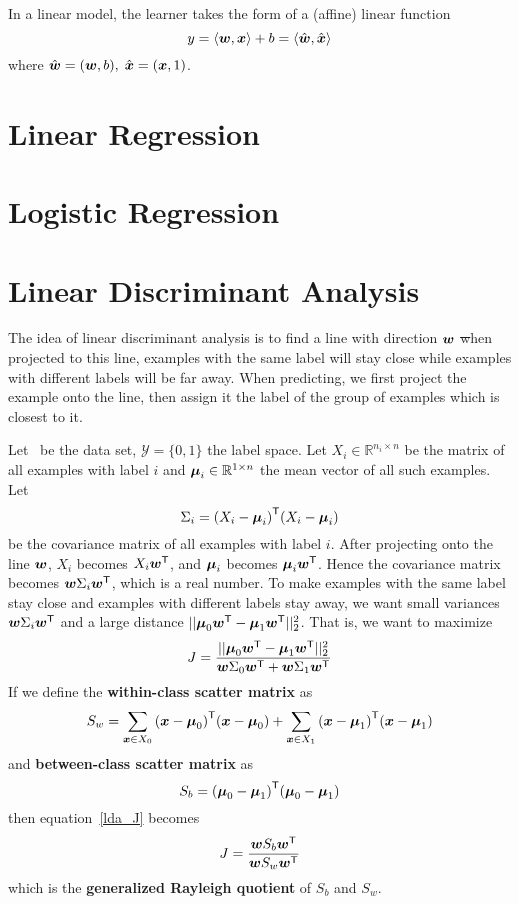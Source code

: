 In a linear model, the learner takes the form of a (affine) linear function
$$y = \langle\boldsymbol{w}, \boldsymbol{x}\rangle + b = \langle\hat{\boldsymbol{w}}, \hat{\boldsymbol{x}}\rangle$$
where $\hat{\boldsymbol{w}}=(\boldsymbol{w}, b),\;\hat{\boldsymbol{x}} = (\boldsymbol{x}, 1)$.
\section{Linear Regression}

\section{Logistic Regression}

\section{Linear Discriminant Analysis}
The idea of linear discriminant analysis is to find a line with direction $\boldsymbol{w}$ \st when
projected to this line, examples with the same label will stay close while examples with different
labels will be far away. When predicting, we first project the example onto the line, then assign it the
label of the group of examples which is closest to it.

Let \dataset\ be the data set, $\mathcal{Y} = \{0, 1\}$ the label space. Let 
$X_i \in \mathbb{R}^{n_i \times n}$ be the matrix of all examples with label $i$ and 
$\boldsymbol{\mu}_i \in \mathbb{R}^{1 \times n}$ the mean vector of all such examples. Let 
$$ \Sigma_i = {(X_i - \boldsymbol{\mu}_i)}^\mathsf{T}(X_i - \boldsymbol{\mu}_i)$$
be the covariance matrix of all examples with label $i$. After
projecting onto the line $\boldsymbol{w}$, $X_i$ becomes $X_i {\boldsymbol{w}}^\mathsf{T}$, and $\boldsymbol{\mu}_i$ becomes
$\boldsymbol{\mu}_i{\boldsymbol{w}}^\mathsf{T}$. Hence the covariance matrix becomes $\boldsymbol{w} \Sigma_i {\boldsymbol{w}}^\mathsf{T}$, which is a real number.
To make examples with the same label stay close and examples with different labels stay away, we want small 
variances $\boldsymbol{w} \Sigma_i {\boldsymbol{w}}^\mathsf{T}$ and a large distance $||{\boldsymbol{\mu}_0{\boldsymbol{w}}^\mathsf{T} - \boldsymbol{\mu}_1{\boldsymbol{w}}^\mathsf{T}}||_{2}^2$.
That is, we want to maximize
\begin{equation}\label{lda_J}
    J = \frac{||{\boldsymbol{\mu}_0{\boldsymbol{w}}^\mathsf{T} - \boldsymbol{\mu}_1{\boldsymbol{w}}^\mathsf{T}}||_{2}^2}{\boldsymbol{w} \Sigma_0 {\boldsymbol{w}}^\mathsf{T} + 
    \boldsymbol{w} \Sigma_1 {\boldsymbol{w}}^\mathsf{T}}
\end{equation}
If we define the \textbf{within-class scatter matrix} as
\begin{equation}
    S_w = \sum_{\boldsymbol{x}\in X_0} {(\boldsymbol{x} - \boldsymbol{\mu}_0)}^\mathsf{T}(\boldsymbol{x} - \boldsymbol{\mu}_0)
    + \sum_{\boldsymbol{x}\in X_1} {(\boldsymbol{x} - \boldsymbol{\mu}_1)}^\mathsf{T}(\boldsymbol{x} - \boldsymbol{\mu}_1)
\end{equation}
and \textbf{between-class scatter matrix} as
\begin{equation}
    S_b = {(\boldsymbol{\mu}_0 - \boldsymbol{\mu}_1)}^\mathsf{T}(\boldsymbol{\mu}_0 - \boldsymbol{\mu}_1)
\end{equation}
then equation~\eqref{lda_J} becomes
\begin{equation}
    J = \frac{\boldsymbol{w}S_b{\boldsymbol{w}}^\mathsf{T}}{\boldsymbol{w}S_w{\boldsymbol{w}}^\mathsf{T}}
\end{equation}
which is the \textbf{generalized Rayleigh quotient} of $S_b$ and $S_w$.

